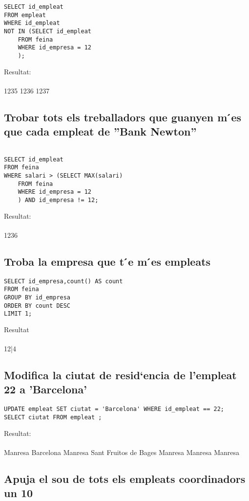 \documentclass[11p]{article}
\begin{document}
\begin{lstlisting}
SELECT id_empleat 
FROM empleat 
WHERE id_empleat 
NOT IN (SELECT id_empleat 
	FROM feina 
	WHERE id_empresa = 12
	);
\end{lstlisting}
Resultat:\\\\
1235
1236
1237

\subsection{Trobar tots els treballadors que guanyen m ́es que cada empleat de ”Bank Newton”}

\begin{lstlisting}

SELECT id_empleat 
FROM feina 
WHERE salari > (SELECT MAX(salari)  
	FROM feina 
	WHERE id_empresa = 12
	) AND id_empresa != 12;

\end{lstlisting}

Resultat: \\\\
1236

\subsection{Troba la empresa que t ́e m ́es empleats}

\begin{lstlisting}
SELECT id_empresa,count() AS count 
FROM feina 
GROUP BY id_empresa 
ORDER BY count DESC
LIMIT 1;
\end{lstlisting}
Resultat\\\\
12|4

\subsection{Modifica la ciutat de resid`encia de l’empleat 22 a ’Barcelona’}
\begin{lstlisting}
UPDATE empleat SET ciutat = 'Barcelona' WHERE id_empleat == 22;
SELECT ciutat FROM empleat ;
\end{lstlisting}
Resultat:\\\\

Manresa
Barcelona
Manresa
Sant Fruitos de Bages
Manresa
Manresa
Manresa

\subsection{Apuja el sou de tots els empleats coordinadors un 10}
\end{document}

